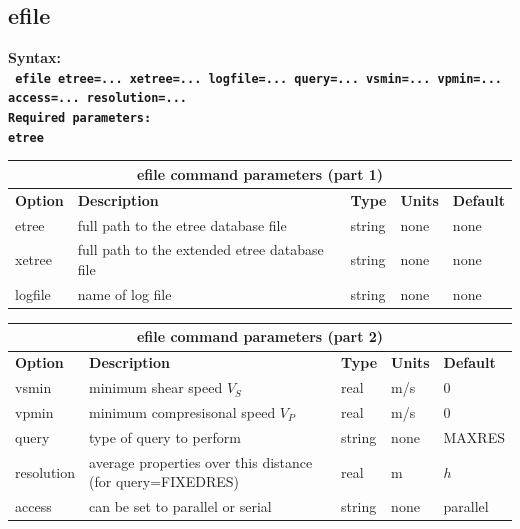 \documentclass[11pt]{report}
\begin{document}
%

\subsection{efile}
\label{keyword:efile}
\begin{flushleft}
\bf
Syntax:\\
\tt
efile etree=... xetree=... logfile=... query=... vsmin=... vpmin=... access=... resolution=...\\
\bf 
Required parameters:\\
\tt etree
\end{flushleft}
\begin{center}
\begin{tabular}{|l|p{8cm}|l|l|l|} \hline
\multicolumn{5}{|c|}{\bf efile command parameters (part 1)}\\ \hline
\bf{Option} & \bf{Description}                                    & \bf{Type} & \bf{Units} & \bf{Default} \\ \hline 
\hline
etree      & full path to the etree database file                 & string   & none       & none \\ \hline
xetree     & full path to the extended etree database file        & string   & none       & none \\ \hline
logfile    & name of log file                                     & string   & none   & none \\ \hline
\end{tabular}
\end{center}
\begin{center}
\begin{tabular}{|l|p{8cm}|l|l|l|} \hline
\multicolumn{5}{|c|}{\bf efile command parameters (part 2)}\\ \hline
\bf{Option} & \bf{Description}                                & \bf{Type} & \bf{Units} & \bf{Default} \\ \hline 
\hline
vsmin   & minimum shear speed $V_S$         & real    & m/s    & 0 \\ \hline
vpmin   & minimum compresisonal speed $V_P$ & real    & m/s    & 0 \\ \hline 
\hline
query      & type of query to perform                         & string  & none   & MAXRES \\ \hline
resolution & average properties over this distance (for query=FIXEDRES) & real  & m      & $h$ \\ \hline
access     & can be set to parallel or serial                 & string  & none   &  parallel \\ \hline
\end{tabular}
\end{center}
\end{document}
